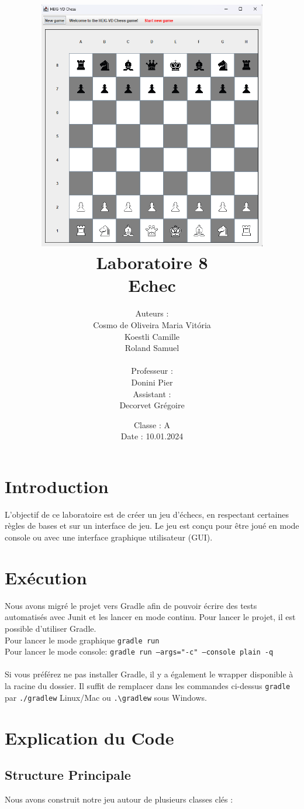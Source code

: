 \documentclass[12pt]{article}
\title{
    \vspace{-2cm}
    \includegraphics[width=10cm]{chessgame.png} \\
    \Huge{Laboratoire 8} \\
    \Large{Echec}
}
\author{
    Auteurs : \\
    Cosmo de Oliveira Maria Vitória \\
    Koestli Camille \\
    Roland Samuel \\
    \\
    Professeur : \\
    Donini Pier \\
    Assistant : \\
    Decorvet Grégoire
}
\date{
    Classe : A \\
    Date : 10.01.2024
}
\begin{document}
    \maketitle

    \thispagestyle{empty} %
    \newpage

\maketitle

\section{Introduction}

L'objectif de ce laboratoire est de créer un jeu d'échecs, en respectant certaines règles de bases et sur un interface de jeu. Le jeu est conçu pour être joué en mode console ou avec une interface graphique utilisateur (GUI).

\section{Exécution}

Nous avons migré le projet vers Gradle afin de pouvoir écrire des tests automatisés avec Junit et les lancer en mode continu. Pour lancer le projet, il est possible d'utiliser Gradle.\\
Pour lancer le mode graphique \texttt{gradle run}\\
Pour lancer le mode console: \texttt{gradle run --args="-c" --console plain -q}\\
\\Si vous préférez ne pas installer Gradle, il y a également le wrapper disponible à la racine du dossier. Il suffit de remplacer dans les commandes ci-dessus \texttt{gradle} par \texttt{./gradlew} Linux/Mac ou \texttt{.\textbackslash gradlew} sous Windows.

\section{Explication du Code}

\subsection{Structure Principale}

Nous avons construit notre jeu autour de plusieurs classes clés :
\end{document}
